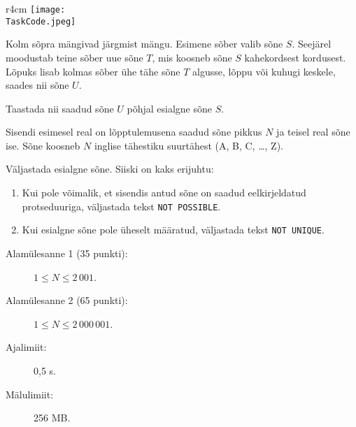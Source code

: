 \documentclass{boi2014-et}
\renewcommand{\TaskCode}{friends}
\begin{document}
    \begin{wrapfigure}{r}{4cm}
        \vspace{-24pt}
        \texttt{[image: \\TaskCode.jpeg]}
    \end{wrapfigure}

    Kolm sõpra mängivad järgmist mängu.
    Esimene sõber valib sõne $S$.
    Seejärel moodustab teine sõber uue sõne $T$, mis koosneb sõne $S$ kahekordsest kordusest.
    Lõpuks lisab kolmas sõber ühe tähe sõne $T$ algusse, lõppu või kuhugi keskele, saades nii sõne $U$.

    \Task

    Taastada nii saadud sõne $U$ põhjal esialgne sõne $S$.

    \Input

    Sisendi esimesel real on lõpptulemusena saadud sõne pikkus $N$ ja teisel real sõne ise.
    Sõne koosneb $N$ inglise tähestiku suurtähest (A, B, C, \ldots, Z).

    \Output

    Väljastada esialgne sõne.
    Siiski on kaks erijuhtu:
    \begin{enumerate}
        \item Kui pole võimalik, et sisendis antud sõne on saadud eelkirjeldatud
            protseduuriga, väljastada tekst {\tt NOT POSSIBLE}.
        \item Kui esialgne sõne pole üheselt määratud, väljastada tekst {\tt NOT UNIQUE}.
    \end{enumerate}

    \Examples


    \Scoring

    \begin{description}
        \item[Alamülesanne 1 (35 punkti):] $1 \le N \le 2\,001$.
        \item[Alamülesanne 2 (65 punkti):] $1 \le N \le 2\,000\,001$.
    \end{description}

    \Constraints

    \begin{description}
        \item[Ajalimiit:] 0,5 s.
        \item[Mälulimiit:] 256 MB.
    \end{description}
\end{document}
